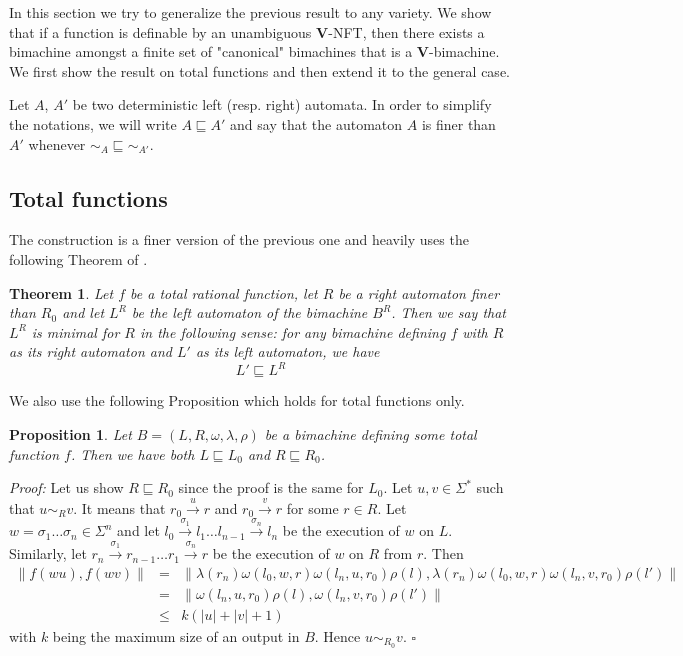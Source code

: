 \documentclass[12pt]{report}
\newtheorem{thm}{Theorem}[section]
\newtheorem{prp}{Proposition}[section]
\theoremstyle{definition}
\theoremstyle{remark}
\newenvironment{prf}
{\textit{Proof:}}
{\hfill $\square$\\}
\begin{document}
In this section we try to generalize the previous result to any variety.
We show that if a function is definable by an unambiguous \textbf V-NFT, then there exists a bimachine amongst a finite set of "canonical" bimachines that is a \textbf V-bimachine.
We first show the result on total functions and then extend it to the general case.

Let $A$, $A'$ be two deterministic left (resp. right) automata.
In order to simplify the notations, we will write $A\sqsubseteq {A'}$ and say that the automaton $A$ is finer than $A'$ whenever ${\sim_A}\sqsubseteq{\sim_{A'}}$.

\subsection{Total functions}
The construction is a finer version of the previous one and heavily uses the following Theorem of \cite{reutenauers91}.
\begin{thm}
\label{thm1}
Let $f$ be a total rational function, let $R$ be a right automaton finer than $R_0$ and let $L^R$ be the left automaton of the bimachine $B^R$.
Then we say that $L^R$ is \emph{minimal for  $R$} in the following sense:
for any bimachine defining $f$ with $R$ as its right automaton and $L'$ as its left automaton, we have $${L'} \sqsubseteq {L^R}$$
\end{thm}

We also use the following Proposition which holds for total functions only.
\begin{prp}
Let $B=(L,R,\omega,\lambda,\rho)$ be a bimachine defining some total function $f$.
Then we have both ${L} \sqsubseteq {L_0}$ and ${R} \sqsubseteq {R_0}$.
\end{prp}
\begin{prf}
Let us show ${R} \sqsubseteq {R_0}$ since the proof is the same for $L_0$.
Let $u,v\in \Sigma^\ast$ such that $u\sim_R v$.
It means that $r_0\xrightarrow u r$ and $r_0\xrightarrow v r$ for some $r\in R$.
Let $w=\sigma_1\ldots\sigma_n\in \Sigma^n$ and let $l_0\xrightarrow {\sigma_1} l_1 \ldots l_{n-1}\xrightarrow {\sigma_n} l_n$ be the execution of $w$ on $L$.
Similarly, let $r_n\xrightarrow {\sigma_1} r_{n-1} \ldots r_{1}\xrightarrow {\sigma_n} r$ be the execution of $w$ on $R$ from $r$.
Then
$$\begin{array}{rcl}
\lVert f(wu),f(wv)\rVert &=&
\lVert \lambda(r_n)\omega(l_0,w,r)\omega(l_n,u,r_0)\rho(l),\lambda(r_n)\omega(l_0,w,r)\omega(l_n,v,r_0)\rho(l')\rVert\\
&=&\lVert \omega(l_n,u,r_0)\rho(l),\omega(l_n,v,r_0)\rho(l')\rVert\\
&\leq& k(|u|+|v|+1)
\end{array}$$
with $k$ being the maximum size of an output in $B$.
Hence $u\sim_{R_0}v$.
\end{prf}
\end{document}
